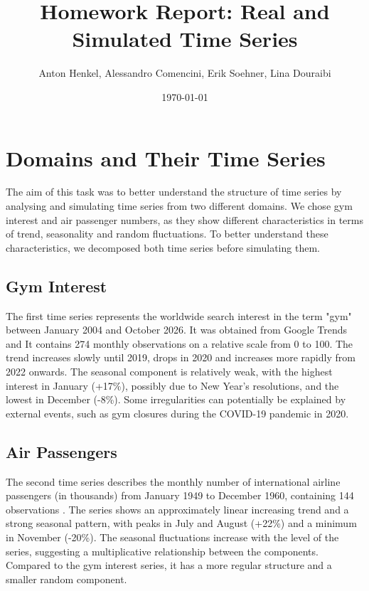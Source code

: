 \documentclass[11pt,a4paper]{article}
\title{Homework Report: Real and Simulated Time Series}
\author{Anton Henkel, Alessandro Comencini, Erik Soehner, Lina Douraibi}
\date{\today}
\begin{document}
\maketitle
\thispagestyle{empty}

\setcounter{page}{1}

\section{Domains and Their Time Series}

The aim of this task was to better understand the structure of time series by analysing and simulating time series from two different domains. 
We chose gym interest and air passenger numbers, as they show different characteristics in terms of trend, seasonality and random fluctuations. To better understand these characteristics, we decomposed both time series before simulating them.

\subsection{Gym Interest}

The first time series represents the worldwide search interest in the term "gym" between January 2004 and October 2026. It was obtained from Google Trends \cite{google-trends-gym} and It contains 274 monthly observations on a relative scale from 0 to 100.
The trend increases slowly until 2019, drops in 2020 and increases more rapidly from 2022 onwards. The seasonal component is relatively weak, with the highest interest in January (+17\%), possibly due to New Year's resolutions, and the lowest in December (-8\%).
Some irregularities can potentially be explained by external events, such as gym closures during the COVID-19 pandemic in 2020.

\subsection{Air Passengers}

The second time series describes the monthly number of international airline passengers (in thousands) from January 1949 to December 1960, containing 144 observations \cite{box-jenkins,selva86-airpassengers}.
The series shows an approximately linear increasing trend and a strong seasonal pattern, with peaks in July and August (+22\%) and a minimum in November (-20\%). The seasonal fluctuations increase with the level of the series, suggesting a multiplicative relationship between the components.
Compared to the gym interest series, it has a more regular structure and a smaller random component.
\end{document}
